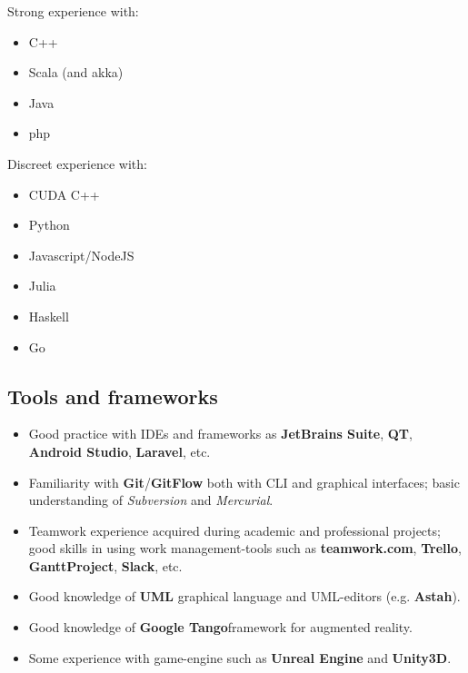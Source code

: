 \documentclass[letterpaper]{twentysecondcv} %
\begin{document}
\begin{minipage}[t]{0.45\linewidth}
	Strong experience with:
	\small
	\begin{itemize}[noitemsep]
		\item C++
		\item Scala (and akka)
		\item Java
		\item php
	\end{itemize}
\end{minipage}
\begin{minipage}[t]{0.45\linewidth}
	Discreet experience with:
	\footnotesize
	\begin{itemize}[noitemsep,nolistsep]
		\item CUDA C++
		\item Python
		\item Javascript/NodeJS
		\item Julia
		\item Haskell
		\item Go
	\end{itemize}
\end{minipage}


\subsection{Tools and frameworks}
\begin{itemize}[noitemsep,nolistsep]
	\item Good practice with IDEs and frameworks as \textbf{JetBrains Suite}, \textbf{QT}, \textbf{Android Studio}, \textbf{Laravel}, etc.
	\item Familiarity with \textbf{Git}/\textbf{GitFlow} both with CLI and graphical interfaces; basic understanding of \textit{Subversion} and \textit{Mercurial}.
	\item Teamwork experience acquired during academic and professional projects; good skills in using work management-tools such as \textbf{teamwork.com}, \textbf{Trello}, \textbf{GanttProject}, \textbf{Slack}, etc.
	\item Good knowledge of \textbf{UML} graphical language and UML-editors (e.g. \textbf{Astah}).
	\item Good knowledge of \textbf{Google Tango}\footnotemark[6] framework for augmented reality.
	\item Some experience with game-engine such as \textbf{Unreal Engine} and \textbf{Unity3D}.
\end{itemize}

\end{document}
